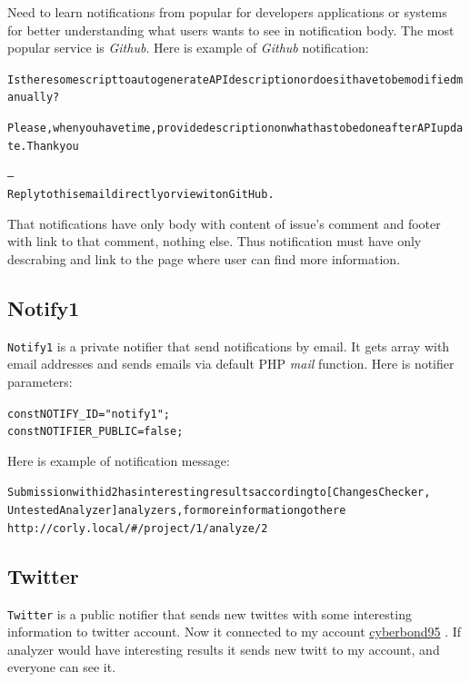 Need to learn notifications from popular for developers applications or systems for better understanding what users wants to see in notification body. The most popular service is \emph{Github}. Here is example of \emph{Github} notification:
\begin{alltt}
Is there some script to autogenerate API description or does it have to be modified manually?

Please, when you have time, provide description on what has to be done after API update. Thank you

—
Reply to this email directly or view it on GitHub.
\end{alltt}

That notifications have only body with content of issue's comment and footer with link to that comment, nothing else. Thus notification must have only descrabing and link to the page where user can find more information. 

\subsection{Notify1}

\texttt{Notify1} is a private notifier that send notifications by email. It gets array with email addresses and sends emails via default PHP \emph{mail} function. Here is notifier parameters:

\begin{alltt}
const NOTIFY_ID = "notify1";
const NOTIFIER_PUBLIC = false;
\end{alltt}

Here is example of notification message:
\begin{alltt}

Submission with id 2 has interesting results according to [ChangesChecker,\\UntestedAnalyzer] analyzers, for more information go there\\ http://corly.local/#/project/1/analyze/2
\end{alltt}

\subsection{Twitter}

\texttt{Twitter} is a public notifier that sends new twittes with some interesting information to twitter account. Now it connected to my account \href{https://twitter.com/cyberbond95}{cyberbond95} . If analyzer would have interesting results it sends new twitt to my account, and everyone can see it.

